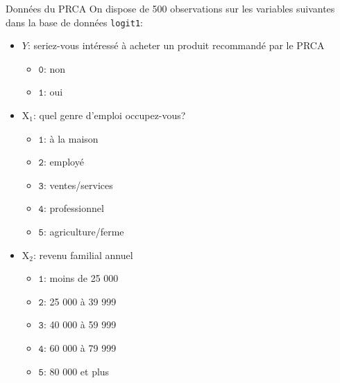 \documentclass[
  ignorenonframetext,
]{beamer}
\providecommand{\tightlist}{%
  \setlength{\itemsep}{0pt}\setlength{\parskip}{0pt}}\usepackage{longtable,booktabs,array}
\begin{document}
\begin{frame}[fragile]{Données du PRCA}
\protect\hypertarget{donnuxe9es-du-prca}{}
On dispose de 500 observations sur les variables suivantes dans la base
de données \texttt{logit1}: \footnotesize 

\begin{itemize}
\tightlist
\item
  \(Y\): seriez-vous intéressé à acheter un produit recommandé par le
  PRCA

  \begin{itemize}
  \tightlist
  \item
    \(\texttt{0}\): non
  \item
    \(\texttt{1}\): oui
  \end{itemize}
\item
  \(\mathrm{X}_1\): quel genre d'emploi occupez-vous?

  \begin{itemize}
  \tightlist
  \item
    \(\texttt{1}\): à la maison
  \item
    \(\texttt{2}\): employé
  \item
    \(\texttt{3}\): ventes/services
  \item
    \(\texttt{4}\): professionnel
  \item
    \(\texttt{5}\): agriculture/ferme
  \end{itemize}
\item
  \(\mathrm{X}_2\): revenu familial annuel

  \begin{itemize}
  \tightlist
  \item
    \(\texttt{1}\): moins de 25 000
  \item
    \(\texttt{2}\): 25 000 à 39 999
  \item
    \(\texttt{3}\): 40 000 à 59 999
  \item
    \(\texttt{4}\): 60 000 à 79 999
  \item
    \(\texttt{5}\): 80 000 et plus
  \end{itemize}
\end{itemize}

\normalsize
\end{frame}
\end{document}
